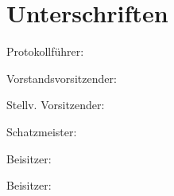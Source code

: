\documentclass[a4paper,12pt]{scrartcl}
\begin{document}

\cleardoublepage
\section*{Unterschriften}
\vspace{0.7cm}
\noindent Protokollführer: \hrulefill\hfill\phantom{c}\par
\vspace{0.7cm}
\noindent Vorstandsvorsitzender: \hrulefill\hfill\phantom{c}\par
\vspace{0.7cm}
\noindent Stellv. Vorsitzender: \hrulefill\hfill\phantom{c}\par
\vspace{0.7cm}
\noindent Schatzmeister: \hrulefill\hfill\phantom{c}\par
\vspace{0.7cm}
\noindent Beisitzer: \hrulefill\hfill\phantom{c}\par
\vspace{0.7cm}
\noindent Beisitzer: \hrulefill\hfill\phantom{c}\par
\end{document}
